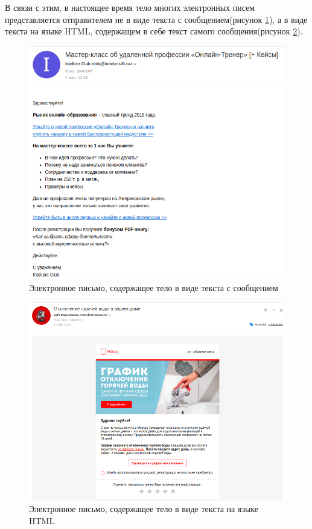 В связи с этим, в настоящее время тело многих электронных писем представляется отправителем не в виде текста с сообщением(рисунок \ref{anal:a1}), а в виде текста на языке HTML, содержащем в себе текст самого сообщения(рисунок \ref{anal:a2}). 
 
 \newpage
 
\begin{figure}[h!]
	\centering
	\includegraphics[scale=0.4]{inc/img/a1.png}
	\caption{Электронное письмо, содержащее тело в виде текста с сообщением}
	\label{anal:a1}
\end{figure}


\begin{figure}[h!]
	\centering
	\includegraphics[scale=0.4]{inc/img/a2.png}
	\caption{Электронное письмо, содержащее тело в виде  текста на языке HTML}
	\label{anal:a2}
\end{figure}

